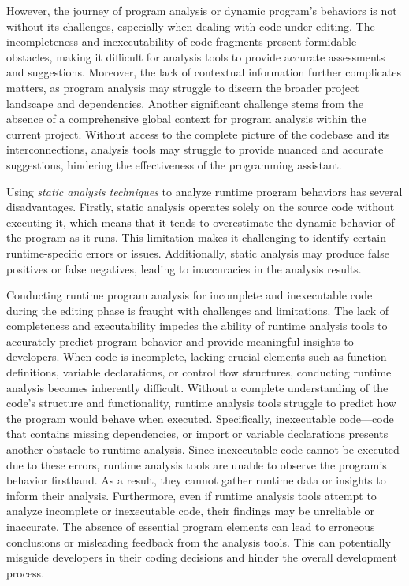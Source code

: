 However, the journey of program analysis or dynamic program's
behaviors is not without its challenges, especially when dealing with
code under editing. The incompleteness and inexecutability of code
fragments present formidable obstacles, making it difficult for
analysis tools to provide accurate assessments and
suggestions. Moreover, the lack of contextual information further
complicates matters, as program analysis may struggle to discern the
broader project landscape and dependencies. Another significant
challenge stems from the absence of a comprehensive global context for
program analysis within the current project. Without access to the
complete picture of the codebase and its interconnections, analysis
tools may struggle to provide nuanced and accurate suggestions,
hindering the effectiveness of the programming assistant.

Using {\em static analysis techniques} to analyze runtime program
behaviors has several disadvantages. Firstly, static analysis operates
solely on the source code without executing it, which means that it
tends to overestimate the dynamic behavior of the program as it
runs. This limitation makes it challenging to identify certain
runtime-specific errors or issues.
Additionally, static analysis may produce false positives or false
negatives, leading to inaccuracies in the analysis results.

Conducting runtime program analysis for incomplete and inexecutable
code during the editing phase is fraught with challenges and
limitations. The lack of completeness and executability impedes the
ability of runtime analysis tools to accurately predict program
behavior and provide meaningful insights to developers.  When code is
incomplete, lacking crucial elements such as function definitions,
variable declarations, or control flow structures, conducting runtime
analysis becomes inherently difficult. Without a complete
understanding of the code's structure and functionality, runtime
analysis tools struggle to predict how the program would behave when
executed. Specifically, inexecutable code—code that contains missing
dependencies, or import or variable declarations presents another
obstacle to runtime analysis. Since inexecutable code cannot be
executed due to these errors, runtime analysis tools are unable to
observe the program's behavior firsthand. As a result, they cannot
gather runtime data or insights to inform their analysis.
%
Furthermore, even if runtime analysis tools attempt to analyze
incomplete or inexecutable code, their findings may be unreliable or
inaccurate. The absence of essential program elements can lead to
erroneous conclusions or misleading feedback from the analysis
tools. This can potentially misguide developers in their coding
decisions and hinder the overall development process.

